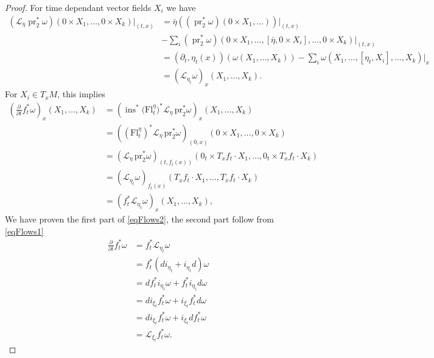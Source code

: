 \documentclass{article}
\numberwithin{theorem}{section}
\theoremstyle{definition}
\begin{document}
\begin{proof}
    For time dependant vector fields $X_i$ we have 
    \begin{equation*}
        \begin{split}
            \left(\mathcal{L}_{\bar{\eta}} \operatorname{pr}_2^* \omega\right) (0 \times X_1, \ldots,0 \times X_k)|_{(t,x)} 
            &= \bar{\eta} (( \operatorname{pr}_2^* \omega) (0 \times X_1, \ldots))|_{(t,x)} \\
            &-\sum_i (\operatorname{pr}_2^* \omega) (0 \times X_1, \ldots, [\bar{\eta}, 0 \times X_i], \ldots, 0 \times X_k)|_{(t,x)}\\
            &=\left(\partial_t, \eta_t(x)\right)\left(\omega\left(X_1, \ldots, X_k\right)\right) - \sum_i \omega\left(X_1, \ldots,\left[\eta_t, X_i\right], \ldots, X_k\right)|_x \\ 
            &= \left(\mathcal{L}_{\eta_t} \omega\right)_x\left(X_1, \ldots, X_k\right).
        \end{split}
    \end{equation*}
    For $X_i \in T_xM$, this implies
    \begin{equation}
        \begin{split}
            \left( \frac{\partial}{\partial t} f_t^* \omega \right)_x (X_1, \ldots, X_k) 
            &= \left( \operatorname{ins}^*\bigl(\mathrm{Fl}^{\eta}_t\bigr)^* \mathcal{L}_\eta \, \mathrm{pr}_2^* \omega \right)_x (X_1, \ldots, X_k) \\
            &= \left( \left(\mathrm{Fl}^{\eta}_t\right)^* \mathcal{L}_\eta \, \mathrm{pr}_2^* \omega \right)_{(0,x)} (0 \times X_1, \ldots, 0 \times X_k) \\
            &= \left( \mathcal{L}_\eta \, \mathrm{pr}_2^* \omega \right)_{(t, f_t(x))} (0_t \times T_x f_t \cdot X_1, \ldots, 0_t \times T_x f_t \cdot X_k) \\
            &= \left( \mathcal{L}_{\eta_t} \omega \right)_{f_t(x)} (T_x f_t \cdot X_1, \ldots, T_x f_t \cdot X_k) \\
            &= \left( f_t^* \mathcal{L}_{\eta_t} \omega \right)_x (X_1, \ldots, X_k),
        \end{split}
    \end{equation}
    We have proven the first part of \eqref{eqFlows2}, the second part follow from \eqref{eqFlows1}
    \begin{equation}
        \begin{split}
        \frac{\partial}{\partial t} f_t^* \omega 
        &= f_t^* \mathcal{L}_{\eta_t} \omega \\
        &= f_t^* \left( d i_{\eta_t} + i_{\eta_t} d \right) \omega \\
        &= d f_t^* i_{\eta_t} \omega + f_t^* i_{\eta_t} d \omega \\
        &= d i_{\xi_t} f_t^* \omega + i_{\xi_t} f_t^* d \omega \\
        &= d i_{\xi_t} f_t^* \omega + i_{\xi_t} d f_t^* \omega \\
        &= \mathcal{L}_{\xi_t} f_t^* \omega.
        \end{split}
        \end{equation}
\end{proof}
\end{document}
